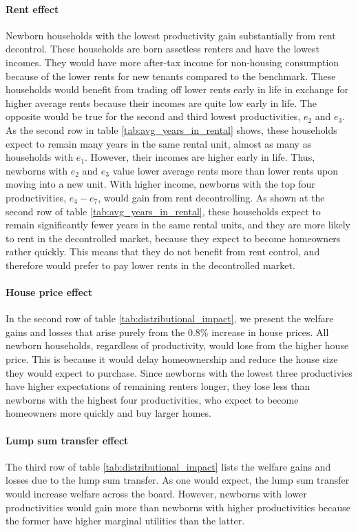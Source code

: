 \documentclass[parskip=full]{article}
\begin{document}
\paragraph{Rent effect} Newborn households with the lowest productivity gain substantially from rent decontrol. These households are born assetless renters and have the lowest incomes. They would have more after-tax income for non-housing consumption because of the lower rents for new tenants compared to the benchmark. These households would benefit from trading off lower rents early in life in exchange for higher average rents because their incomes are quite low early in life. The opposite would be true for the second and third lowest productivities, $e_{2}$ and $e_{3}$. As the second row in table \ref{tab:avg_years_in_rental} shows, these households expect to remain many years in the same rental unit, almost as many as households with $e_{1}$. However, their incomes are higher early in life. Thus, newborns with $e_{2}$ and $e_{3}$ value lower average rents more than lower rents upon moving into a new unit. With higher income, newborns with the top four productivities, $e_{4}-e_{7}$, would gain from rent decontrolling. As shown at the second row of table \ref{tab:avg_years_in_rental}, these households expect to remain significantly fewer years in the same rental units, and they are more likely to rent in the decontrolled market, because they expect to become homeowners rather quickly. This means that they do not benefit from rent control, and therefore would prefer to pay lower rents in the decontrolled market.

\paragraph{House price effect} In the second row of table \ref{tab:distributional_impact}, we present the welfare gains and losses that arise purely from the 0.8\% increase in house prices. All newborn households, regardless of productivity, would lose from the higher house price. This is because it would delay homeownership and reduce the house size they would expect to purchase. Since newborns with the lowest three productivies have higher expectations of remaining renters longer, they lose less than newborns with the highest four productivities, who expect to become homeowners more quickly and buy larger homes. 

\paragraph{Lump sum transfer effect} The third row of table \ref{tab:distributional_impact} lists the welfare gains and losses due to the lump sum transfer. As one would expect, the lump sum transfer would increase welfare across the board. However, newborns with lower productivities would gain more than newborns with higher productivities because the former have higher marginal utilities than the latter.
\end{document}
